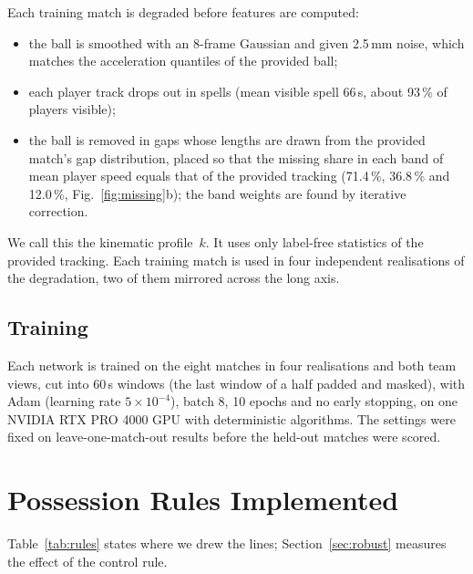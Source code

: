 \documentclass[conference]{IEEEtran}
\begin{document}
Each training match is degraded before features are computed:
\begin{itemize}
\item the ball is smoothed with an 8-frame Gaussian and given 2.5\,mm noise, which matches the acceleration
quantiles of the provided ball;
\item each player track drops out in spells (mean visible spell 66\,s, about 93\,\% of players visible);
\item the ball is removed in gaps whose lengths are drawn from the provided match's gap distribution, placed so that
the missing share in each band of mean player speed equals that of the provided tracking (71.4\,\%, 36.8\,\% and
12.0\,\%, Fig.~\ref{fig:missing}b); the band weights are found by iterative correction.
\end{itemize}
We call this the kinematic profile~$k$. It uses only label-free statistics of the provided tracking. Each training
match is used in four independent realisations of the degradation, two of them mirrored across the long axis.

\subsection{Training}

Each network is trained on the eight matches in four realisations and both team views, cut into 60\,s windows (the
last window of a half padded and masked), with Adam (learning rate $5\times10^{-4}$), batch 8, 10 epochs and no early
stopping, on one NVIDIA RTX PRO 4000 GPU with deterministic algorithms. The settings were fixed on leave-one-match-out
results before the held-out matches were scored.

\section{Possession Rules Implemented}

Table~\ref{tab:rules} states where we drew the lines; Section~\ref{sec:robust} measures the effect of the control
rule.
\end{document}
